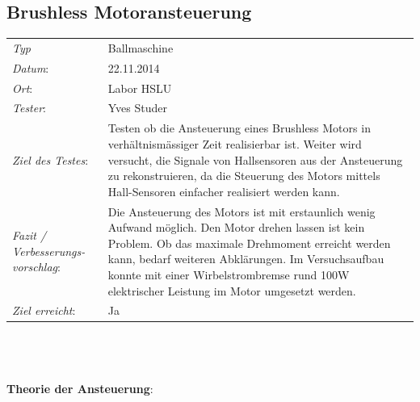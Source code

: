 \subsection{Brushless Motoransteuerung}

\begin{tabular}{p{3.6cm}p{9.4cm}}
\textit{Typ}              & Ballmaschine\\ 
\textit{Datum}:           & 22.11.2014\\
\textit{Ort}:             & Labor HSLU\\
\textit{Tester}:          & Yves Studer\\
\textit{Ziel des Testes}: & Testen ob die Ansteuerung eines Brushless Motors in verhältnismässiger Zeit realisierbar ist. Weiter wird versucht, die Signale von Hallsensoren aus der Ansteuerung zu rekonstruieren, da die Steuerung des Motors mittels Hall-Sensoren einfacher realisiert werden kann.\\
\textit{Fazit / Verbesserungs-\newline vorschlag}: & Die Ansteuerung des Motors ist mit erstaunlich wenig Aufwand möglich. Den Motor drehen lassen ist kein Problem. Ob das maximale Drehmoment erreicht werden kann, bedarf weiteren Abklärungen. Im Versuchsaufbau konnte mit einer Wirbelstrombremse rund 100W elektrischer Leistung im Motor umgesetzt werden. \\ 
\textit{Ziel erreicht}:& Ja\\
\end{tabular}\\
\\
\\
\textbf{Theorie der Ansteuerung}:\\
